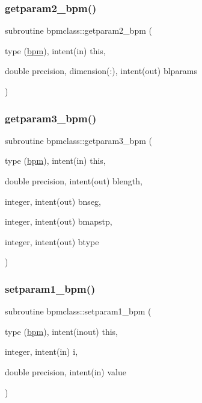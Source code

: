 \subsubsection{\texorpdfstring{getparam2\_bpm()}{getparam2\_bpm()}}
{\footnotesize\ttfamily subroutine bpmclass\+::getparam2\+\_\+bpm (\begin{DoxyParamCaption}\item[{type (\mbox{\hyperlink{namespacebpmclass_structbpmclass_1_1bpm}{bpm}}), intent(in)}]{this,  }\item[{double precision, dimension(\+:), intent(out)}]{blparams }\end{DoxyParamCaption})}

\mbox{\label{namespacebpmclass_a290f2f59ee0b68d7f56e678b87f43393}} 
\subsubsection{\texorpdfstring{getparam3\_bpm()}{getparam3\_bpm()}}
{\footnotesize\ttfamily subroutine bpmclass\+::getparam3\+\_\+bpm (\begin{DoxyParamCaption}\item[{type (\mbox{\hyperlink{namespacebpmclass_structbpmclass_1_1bpm}{bpm}}), intent(in)}]{this,  }\item[{double precision, intent(out)}]{blength,  }\item[{integer, intent(out)}]{bnseg,  }\item[{integer, intent(out)}]{bmapstp,  }\item[{integer, intent(out)}]{btype }\end{DoxyParamCaption})}

\mbox{\label{namespacebpmclass_ac6cf17939baa6ee32b20af627036c73e}} 
\subsubsection{\texorpdfstring{setparam1\_bpm()}{setparam1\_bpm()}}
{\footnotesize\ttfamily subroutine bpmclass\+::setparam1\+\_\+bpm (\begin{DoxyParamCaption}\item[{type (\mbox{\hyperlink{namespacebpmclass_structbpmclass_1_1bpm}{bpm}}), intent(inout)}]{this,  }\item[{integer, intent(in)}]{i,  }\item[{double precision, intent(in)}]{value }\end{DoxyParamCaption})}

